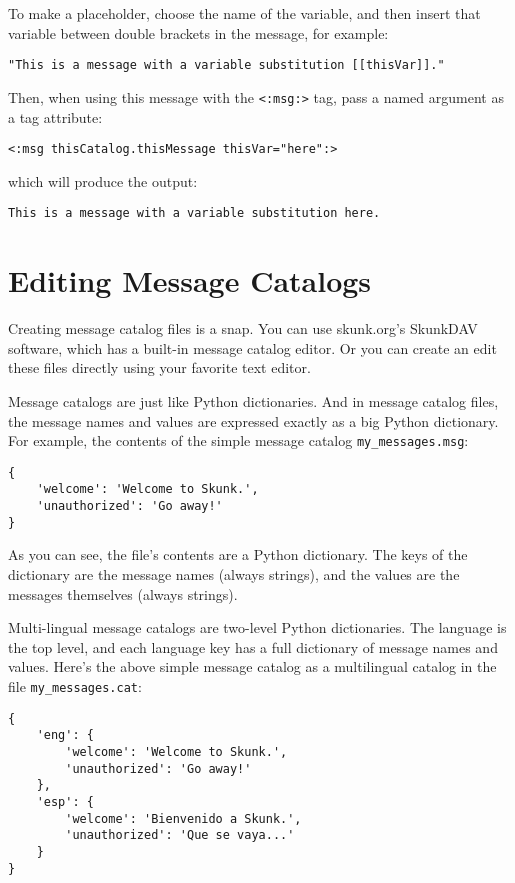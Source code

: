 \documentclass{manual}
\begin{document}
To make a placeholder, choose the name of the variable, 
and then insert that variable between double brackets in
the message, for example:

\begin{verbatim}
"This is a message with a variable substitution [[thisVar]]."
\end{verbatim}

Then, when using this message with the
\texttt{<:msg:>} 
tag, pass a named argument as a tag attribute:

\begin{verbatim}
<:msg thisCatalog.thisMessage thisVar="here":>
\end{verbatim}

which will produce the output:

\begin{verbatim}
This is a message with a variable substitution here.
\end{verbatim}


\section{Editing Message Catalogs}
\label{msgcatedit}

Creating message catalog files is a snap. You can
use skunk.org's SkunkDAV software, which has a built-in
message catalog editor. Or you can create an edit
these files directly using your favorite text editor.

Message catalogs are just like Python dictionaries.
And in message catalog files, the message names and
values are expressed exactly as a big Python dictionary.
For example, the contents of the simple message catalog
\texttt{my_messages.msg}:

\begin{verbatim}
{
    'welcome': 'Welcome to Skunk.',
    'unauthorized': 'Go away!'
}
\end{verbatim}


As you can see, the file's contents are a
Python dictionary. The keys of the dictionary
are the message names (always strings), and
the values are the messages themselves (always
strings).

Multi-lingual message catalogs are two-level
Python dictionaries. The language is the top level,
and each language key has a full dictionary of 
message names and values. Here's the above simple
message catalog as a multilingual catalog in
the file \texttt{my_messages.cat}:

\begin{verbatim}
{
    'eng': {
        'welcome': 'Welcome to Skunk.',
        'unauthorized': 'Go away!'
    },
    'esp': {
        'welcome': 'Bienvenido a Skunk.',
        'unauthorized': 'Que se vaya...'
    }
}
\end{verbatim}
\end{document}
